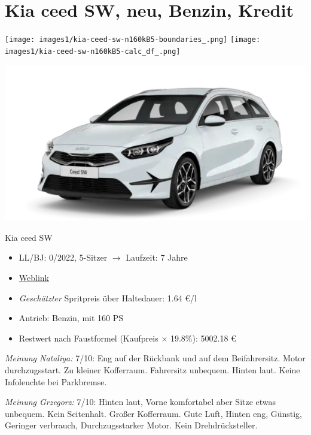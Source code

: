 \documentclass[landscape, DIV=99, 14pt]{scrartcl}
\begin{document}
\twocolumn

\section*{Kia ceed SW, neu, Benzin, Kredit}
\begin{center}
\texttt{[image: images1/kia-ceed-sw-n160kB5-boundaries\_.png]}
\null
\vspace{0.5cm}
\texttt{[image: images1/kia-ceed-sw-n160kB5-calc\_df\_.png]}
\end{center}

\pagebreak
\begin{center}
\includegraphics[width=0.9\columnwidth]{cars/kia-ceed-sportswagon.png}

Kia ceed SW
\end{center}

\begin{itemize}
    \item LL/BJ: 0/2022, 5-Sitzer $\rightarrow$ Laufzeit: 7 Jahre
    \item \href{https://konfigurator.meinauto.de/kia/neuwagen/cee-d/angebote/cee-d-sporty-wagon/konfigurator/\#!/extras/spirit/8865371/3,11,27/private/109347-4167-291321/1321/61d21ce73c5db/cash-purchase/109348-8088-291322/48,0,10000,0,0,0,0,0,}{Weblink}
    \item \emph{Gesch\"atzter} Spritpreis \"uber Haltedauer: 1.64 \euro{}/l
    \item Antrieb: Benzin, mit 160 PS
    \item Restwert nach Faustformel (Kaufpreis $\times$ 19.8\%): 5002.18 \euro{}
\end{itemize}

\begin{small}
\emph{Meinung Nataliya:} 7/10: Eng auf der Rückbank und auf dem Beifahrersitz. Motor durchzugsstart. Zu kleiner Kofferraum. Fahrersitz unbequem. Hinten laut. Keine Infoleuchte bei Parkbremse.
        
\emph{Meinung Grzegorz:} 7/10: Hinten laut, Vorne komfortabel aber Sitze etwas unbequem. Kein Seitenhalt. Großer Kofferraum. Gute Luft, Hinten eng, Günstig, Geringer verbrauch, Durchzugsstarker Motor. Kein Drehdrücksteller.
\end{small}
\end{document}
